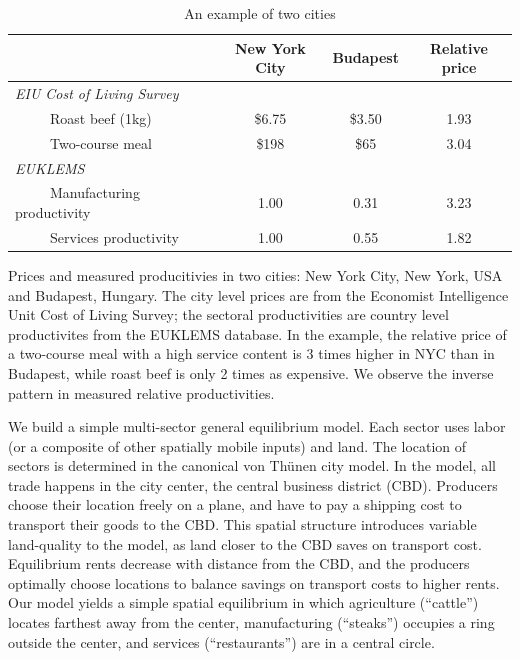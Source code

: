 \documentclass[12pt]{article}
\begin{document}
\begin{table}[h!]
\label{tab:EIU}
\caption{An example of two cities}
\begin{center}
\begin{tabular}{lccc}
 & \textbf{New York City} & \textbf{Budapest} & \textbf{Relative price} \\ \hline
 \emph{EIU Cost of Living Survey} & & & \\
 ~~~~~Roast beef (1kg)            & \$6.75  & \$3.50  & 1.93 \\
 ~~~~~Two-course meal             & \$198   & \$65    & 3.04 \\
 \emph{EUKLEMS}                   & & & \\
 ~~~~~Manufacturing productivity  & 1.00    & 0.31    & 3.23 \\
 ~~~~~Services productivity       & 1.00    & 0.55    & 1.82 \\ %
\end{tabular}
\end{center}
\noindent \footnotesize{Prices and measured producitivies in two cities: New York City, New York, USA and Budapest, Hungary. The city level prices are from the Economist Intelligence Unit Cost of Living Survey; the sectoral productivities are country level productivites from the EUKLEMS database. In the example, the relative price of a two-course meal with a high service content is 3 times higher in NYC than in Budapest, while roast beef is only 2 times as expensive. We observe the inverse pattern in measured relative productivities.}
\end{table}

We build a simple multi-sector general equilibrium model. Each sector uses labor (or a composite of other spatially mobile inputs) and land. The location of sectors is determined in the canonical von Thünen city model. In the model, all trade happens in the city center, the central business district (CBD). Producers choose their location freely on a plane, and have to pay a shipping cost to transport their goods to the CBD. This spatial structure introduces variable land-quality to the model, as land closer to the CBD saves on transport cost. Equilibrium rents decrease with distance from the CBD, and the producers optimally choose locations to balance savings on transport costs to higher rents.
Our model yields a simple spatial equilibrium in which agriculture (``cattle'') locates farthest away from the center, manufacturing (``steaks'') occupies a ring outside the center, and services (``restaurants'') are in a central circle.
\end{document}
